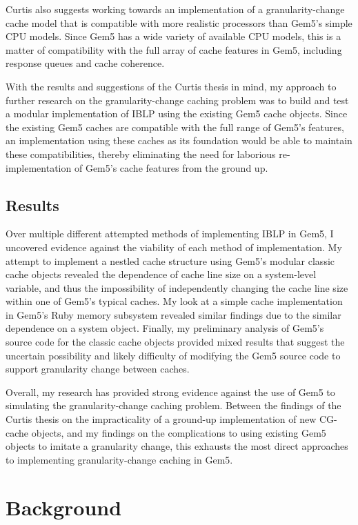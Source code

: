 \documentclass[12pt,twoside]{reedthesis}
\begin{document}
	Curtis also suggests working towards an implementation of a granularity-change cache model that is compatible with more realistic processors than Gem5's simple CPU models. Since Gem5 has a wide variety of available CPU models, this is a matter of compatibility with the full array of cache features in Gem5, including response queues and cache coherence.

	With the results and suggestions of the Curtis thesis in mind, my approach to further research on the granularity-change caching problem was to build and test a modular implementation of IBLP using the existing Gem5 cache objects. Since the existing Gem5 caches are compatible with the full range of Gem5's features, an implementation using these caches as its foundation would be able to maintain these compatibilities, thereby eliminating the need for laborious re-implementation of Gem5's cache features from the ground up.

\section{Results}

Over multiple different attempted methods of implementing IBLP in Gem5, I uncovered evidence against the viability of each method of implementation. My attempt to implement a nestled cache structure using Gem5's modular classic cache objects revealed the dependence of cache line size on a system-level variable, and thus the impossibility of independently changing the cache line size within one of Gem5's typical caches. My look at a simple cache implementation in Gem5's Ruby memory subsystem revealed similar findings due to the similar dependence on a system object. Finally, my preliminary analysis of Gem5's source code for the classic cache objects provided mixed results that suggest the uncertain possibility and likely difficulty of modifying the Gem5 source code to support granularity change between caches.

Overall, my research has provided strong evidence against the use of Gem5 to simulating the granularity-change caching problem. Between the findings of the Curtis thesis on the impracticality of a ground-up implementation of new CG-cache objects, and my findings on the complications to using existing Gem5 objects to imitate a granularity change, this exhausts the most direct approaches to implementing granularity-change caching in Gem5.


\chapter{Background}
\end{document}
